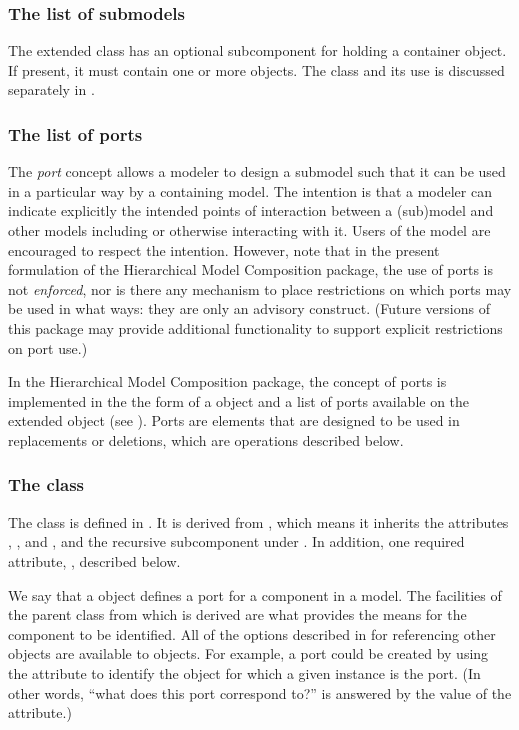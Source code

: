 \subsubsection{The list of submodels}

The extended \Model class has an optional 
subcomponent for holding a \ListOfSubmodels container object.  If
present, it must contain one or more \Submodel objects.  The \Submodel
class and its use is discussed separately in .


\subsubsection{The list of ports}

The \emph{port} concept allows a modeler to design a submodel such that
it can be used in a particular way by a containing model.  The intention
is that a modeler can indicate explicitly the intended points of
interaction between a (sub)model and other models including or otherwise
interacting with it.  Users of the model are encouraged to respect the
intention.  However, note that in the present formulation of the
Hierarchical Model Composition package, the use of ports is not
\emph{enforced}, nor is there any mechanism to place restrictions on
which ports may be used in what ways: they are only an advisory
construct.  (Future versions of this package may provide additional
functionality to support explicit restrictions on port use.)

In the Hierarchical Model Composition package, the concept of ports is
implemented in the the form of a \Port object and a list of ports
available on the extended \Model object (see ).
Ports are elements that are designed to be used in replacements or
deletions, which are operations described below.


\subsubsection{The  class}
\label{port-class}

The \Port class is defined in .  It is derived
from \SBaseRef, which means it inherits the \SBaseRef attributes
, ,  and ,
and the recursive subcomponent under .  In addition,
\Port one required attribute, , described below.

We say that a \Port object defines a port for a component in a model.
The facilities of the \SBaseRef parent class from which \Port is derived
are what provides the means for the component to be identified.  All of
the options described in  for referencing other
objects are available to \Port objects.  For example, a port could be
created by using the  attribute to identify the object
for which a given \Port instance is the port.  (In other words, ``what
does this port correspond to?'' is answered by the value of the
 attribute.)



